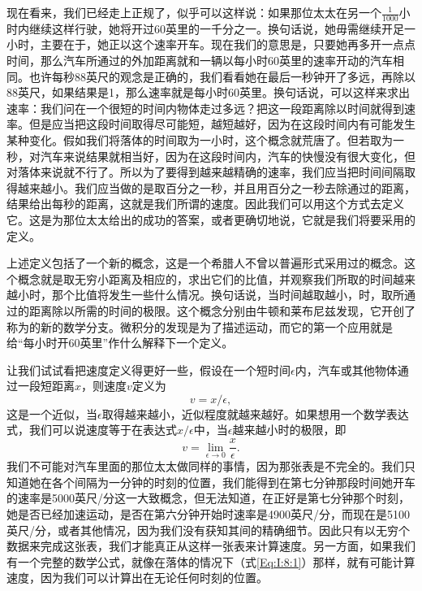 \documentclass[12pt,oneside]{book}
\begin{document}
\begin{common-format}
现在看来，我们已经走上正规了，似乎可以这样说：如果那位太太在另一个$\frac{1}{1000}$小时内继续这样行驶，她将开过60英里的一千分之一。换句话说，她毋需继续开足一小时，主要在于，她正以这个速率开车。现在我们的意思是，只要她再多开一点点时间，那么汽车所通过的外加距离就和一辆以每小时60英里的速率开动的汽车相同。也许每秒88英尺的观念是正确的，我们看看她在最后一秒钟开了多远，再除以88英尺，如果结果是1，那么速率就是每小时60英里。换句话说，可以这样来求出速率：我们问在一个很短的时间内物体走过多远？把这一段距离除以时间就得到速率。但是应当把这段时间取得尽可能短，越短越好，因为在这段时间内有可能发生某种变化。假如我们将落体的时间取为一小时，这个概念就荒唐了。但若取为一秒，对汽车来说结果就相当好，因为在这段时间内，汽车的快慢没有很大变化，但对落体来说就不行了。所以为了要得到越来越精确的速率，我们应当把时间间隔取得越来越小。我们应当做的是取百分之一秒，并且用百分之一秒去除通过的距离，结果给出每秒的距离，这就是我们所谓的速度。因此我们可以用这个方式去定义它。这是为那位太太给出的成功的答案，或者更确切地说，它就是我们将要采用的定义。

上述定义包括了一个新的概念，这是一个希腊人不曾以普遍形式采用过的概念。这个概念就是取无穷小距离及相应的，求出它们的比值，并观察我们所取的时间越来越小时，那个比值将发生一些什么情况。换句话说，当时间越取越小，时，取所通过的距离除以所需的时间的极限。这个概念分别由牛顿和莱布尼兹发现，它开创了称为的新的数学分支。微积分的发现是为了描述运动，而它的第一个应用就是给“每小时开60英里”作什么解释下一个定义。

让我们试试看把速度定义得更好一些，假设在一个短时间$\epsilon$内，汽车或其他物体通过一段短距离$x$，则速度$v$定义为
\begin{equation*}
v=x/\epsilon,
\end{equation*}
这是一个近似，当$\epsilon$取得越来越小，近似程度就越来越好。如果想用一个数学表达式，我们可以说速度等于在表达式$x/\epsilon$中，当$\epsilon$越来越小时的极限，即
\begin{equation}
\label{Eq:I:8:3}
v=\lim_{\epsilon\to0}\frac{x}{\epsilon}.
\end{equation}
我们不可能对汽车里面的那位太太做同样的事情，因为那张表是不完全的。我们只知道她在各个间隔为一分钟的时刻的位置，我们能得到在第七分钟那段时间她开车的速率是5000英尺/分这一大致概念，但无法知道，在正好是第七分钟那个时刻，她是否已经加速运动，是否在第六分钟开始时速率是4900英尺/分，而现在是5100英尺/分，或者其他情况，因为我们没有获知其间的精确细节。因此只有以无穷个数据来完成这张表，我们才能真正从这样一张表来计算速度。另一方面，如果我们有一个完整的数学公式，就像在落体的情况下（式\ref{Eq:I:8:1}）那样，就有可能计算速度，因为我们可以计算出在无论任何时刻的位置。


\end{common-format}
\end{document}
